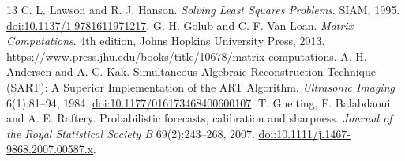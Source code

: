 \documentclass[11pt,a4paper]{article}
\begin{document}
\begin{thebibliography}{13}
 C. L. Lawson and R. J. Hanson. \emph{Solving Least Squares Problems}. SIAM, 1995. \href{https://doi.org/10.1137/1.9781611971217}{doi:10.1137/1.9781611971217}.
 G. H. Golub and C. F. Van Loan. \emph{Matrix Computations}. 4th edition, Johns Hopkins University Press, 2013. \url{https://www.press.jhu.edu/books/title/10678/matrix-computations}.
 A. H. Andersen and A. C. Kak. Simultaneous Algebraic Reconstruction Technique (SART): A Superior Implementation of the ART Algorithm. \emph{Ultrasonic Imaging} 6(1):81--94, 1984. \href{https://doi.org/10.1177/016173468400600107}{doi:10.1177/016173468400600107}.
 T. Gneiting, F. Balabdaoui and A. E. Raftery. Probabilistic forecasts, calibration and sharpness. \emph{Journal of the Royal Statistical Society B} 69(2):243--268, 2007. \href{https://doi.org/10.1111/j.1467-9868.2007.00587.x}{doi:10.1111/j.1467-9868.2007.00587.x}.
\end{thebibliography}
\end{document}
